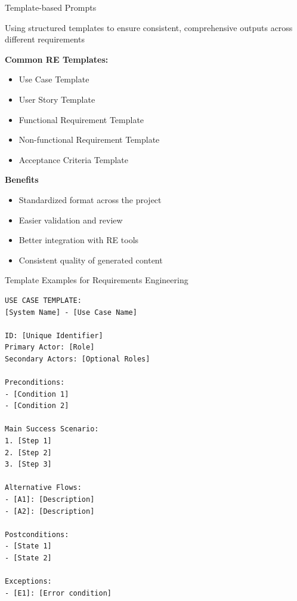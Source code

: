 \documentclass{beamer}
\begin{document}
\begin{frame}[t]{Template-based Prompts}
    \begin{block}{}
        Using structured templates to ensure consistent, comprehensive outputs across different requirements
    \end{block}
    
    \textbf{Common RE Templates:}
    \begin{itemize}
        \scriptsize
        \item Use Case Template
        \item User Story Template
        \item Functional Requirement Template
        \item Non-functional Requirement Template
        \item Acceptance Criteria Template
    \end{itemize}
    
    \begin{exampleblock}{\textbf{Benefits}}
        \begin{itemize}
            \scriptsize
            \item Standardized format across the project
            \item Easier validation and review
            \item Better integration with RE tools
            \item Consistent quality of generated content
        \end{itemize}
    \end{exampleblock}
\end{frame}

\begin{frame}[fragile]{Template Examples for Requirements Engineering}
    \begin{lstlisting}[style=code, caption={Use Case Template}]
USE CASE TEMPLATE:
[System Name] - [Use Case Name]

ID: [Unique Identifier]
Primary Actor: [Role]
Secondary Actors: [Optional Roles]

Preconditions:
- [Condition 1]
- [Condition 2]

Main Success Scenario:
1. [Step 1]
2. [Step 2]
3. [Step 3]

Alternative Flows:
- [A1]: [Description]
- [A2]: [Description]

Postconditions:
- [State 1]
- [State 2]

Exceptions:
- [E1]: [Error condition]
    \end{lstlisting}
\end{frame}
\end{document}
